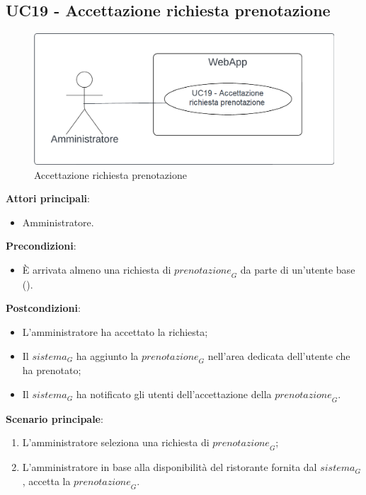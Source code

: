 \subsection{UC19 - Accettazione richiesta prenotazione}\label{usecase:19}
\begin{figure}[H]
    \centering
    \includegraphics[width=0.9\linewidth]{ucd/ucd19.png}
    \caption{Accettazione richiesta prenotazione}
\end{figure}
\textbf{Attori principali}:
\begin{itemize}
    \item Amministratore.
\end{itemize}
\textbf{Precondizioni}:
\begin{itemize}
    \item \`E arrivata almeno una richiesta di $\textit{prenotazione}_G$ da parte di un'utente base ().
\end{itemize}
\textbf{Postcondizioni}:
\begin{itemize}
    \item L'amministratore ha accettato la richiesta;
    \item Il $\textit{sistema}_G$ ha aggiunto la $\textit{prenotazione}_G$ nell'area dedicata dell'utente che ha prenotato;
    \item Il $\textit{sistema}_G$ ha notificato gli utenti dell'accettazione della $\textit{prenotazione}_G$.
\end{itemize}
\textbf{Scenario principale}:
\begin{enumerate}
    \item L'amministratore seleziona una richiesta di $\textit{prenotazione}_G$;
    \item L'amministratore in base alla disponibilità del ristorante fornita dal $\textit{sistema}_G$, accetta la $\textit{prenotazione}_G$.
\end{enumerate}

\newpage

